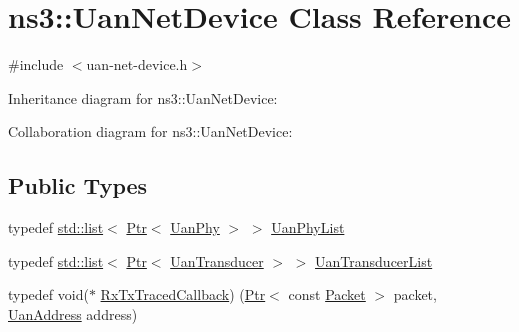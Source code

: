 \hypertarget{classns3_1_1UanNetDevice}{}\section{ns3\+:\+:Uan\+Net\+Device Class Reference}
\label{classns3_1_1UanNetDevice}


{\ttfamily \#include $<$uan-\/net-\/device.\+h$>$}



Inheritance diagram for ns3\+:\+:Uan\+Net\+Device\+:


Collaboration diagram for ns3\+:\+:Uan\+Net\+Device\+:
\subsection*{Public Types}
\begin{DoxyCompactItemize}
\item 
typedef \hyperlink{openflow-interface_8h_afd9bcfa176617760671b67580f536fa7}{std\+::list}$<$ \hyperlink{classns3_1_1Ptr}{Ptr}$<$ \hyperlink{classns3_1_1UanPhy}{Uan\+Phy} $>$ $>$ \hyperlink{classns3_1_1UanNetDevice_af5cc3a49adad7bd3b0013fd88288c1c7}{Uan\+Phy\+List}
\item 
typedef \hyperlink{openflow-interface_8h_afd9bcfa176617760671b67580f536fa7}{std\+::list}$<$ \hyperlink{classns3_1_1Ptr}{Ptr}$<$ \hyperlink{classns3_1_1UanTransducer}{Uan\+Transducer} $>$ $>$ \hyperlink{classns3_1_1UanNetDevice_a83cab60a440452000efb1a8ad3630598}{Uan\+Transducer\+List}
\item 
typedef void($\ast$ \hyperlink{classns3_1_1UanNetDevice_af6b97ffb33aa8fd61b222d8e86494c62}{Rx\+Tx\+Traced\+Callback}) (\hyperlink{classns3_1_1Ptr}{Ptr}$<$ const \hyperlink{classns3_1_1Packet}{Packet} $>$ packet, \hyperlink{classns3_1_1UanAddress}{Uan\+Address} address)
\end{DoxyCompactItemize}

